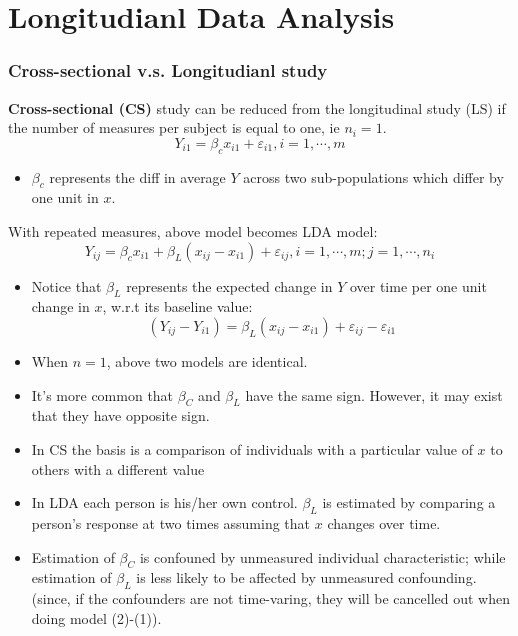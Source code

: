 \documentclass[]{article}
\author{}
\date{}
\begin{document}
\section{Longitudianl Data Analysis}\label{longitudianl-data-analysis}

\subsubsection{Cross-sectional v.s. Longitudianl
study}\label{cross-sectional-v.s.-longitudianl-study}

\textbf{Cross-sectional (CS)} study can be reduced from the longitudinal
study (LS) if the number of measures per subject is equal to one, ie
$n_i=1$. \[Y_{i1}=\beta_cx_{i1}+\varepsilon_{i1}, i=1,\cdots, m\]

\begin{itemize}
\itemsep1pt\parskip0pt
\item
  $\beta_c$ represents the diff in average $Y$ across two
  sub-populations which differ by one unit in $x$.
\end{itemize}

With repeated measures, above model becomes LDA model:
\[Y_{ij}=\beta_cx_{i1}+\beta_L(x_{ij}-x_{i1})+\varepsilon_{ij}, i=1,\cdots,m; j=1,\cdots,n_i\]

\begin{itemize}
\item
  Notice that $\beta_L$ represents the expected change in $Y$ over time
  per one unit change in $x$, w.r.t its baseline value:
  \[(Y_{ij}-Y_{i1})=\beta_L(x_{ij}-x_{i1})+\varepsilon_{ij}-\varepsilon_{i1}\]
\item
  When $n=1$, above two models are identical.
\item
  It's more common that $\beta_C$ and $\beta_L$ have the same sign.
  However, it may exist that they have opposite sign.
\item
  In CS the basis is a comparison of individuals with a particular value
  of $x$ to others with a different value
\item
  In LDA each person is his/her own control. $\beta_L$ is estimated by
  comparing a person's response at two times assuming that $x$ changes
  over time.
\item
  Estimation of $\beta_C$ is confouned by unmeasured individual
  characteristic; while estimation of $\beta_L$ is less likely to be
  affected by unmeasured confounding. (since, if the confounders are not
  time-varing, they will be cancelled out when doing model (2)-(1)).
\end{itemize}
\end{document}
